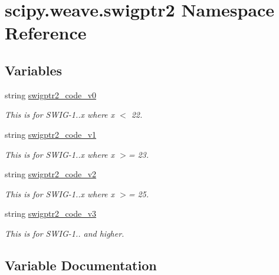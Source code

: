 \hypertarget{namespacescipy_1_1weave_1_1swigptr2}{}\section{scipy.\+weave.\+swigptr2 Namespace Reference}
\label{namespacescipy_1_1weave_1_1swigptr2}
\subsection*{Variables}
\begin{DoxyCompactItemize}
\item 
string \hyperlink{namespacescipy_1_1weave_1_1swigptr2_a585fc46b8f63180b0b9fd2d530d6f3b2}{swigptr2\+\_\+code\+\_\+v0}
\begin{DoxyCompactList}\small\item\em This is for S\+W\+I\+G-\/1..\+x where x $<$ 22. \end{DoxyCompactList}\item 
string \hyperlink{namespacescipy_1_1weave_1_1swigptr2_a8c9c1a3786b0cb399218ee598f5a2cf4}{swigptr2\+\_\+code\+\_\+v1}
\begin{DoxyCompactList}\small\item\em This is for S\+W\+I\+G-\/1..\+x where x $>$= 23. \end{DoxyCompactList}\item 
string \hyperlink{namespacescipy_1_1weave_1_1swigptr2_a2babf5d3e5646c536cc17176f25a9406}{swigptr2\+\_\+code\+\_\+v2}
\begin{DoxyCompactList}\small\item\em This is for S\+W\+I\+G-\/1..\+x where x $>$= 25. \end{DoxyCompactList}\item 
string \hyperlink{namespacescipy_1_1weave_1_1swigptr2_a4fcb47cac914b3c64e18859185d24571}{swigptr2\+\_\+code\+\_\+v3}
\begin{DoxyCompactList}\small\item\em This is for S\+W\+I\+G-\/1.. and higher. \end{DoxyCompactList}\end{DoxyCompactItemize}


\subsection{Variable Documentation}
\hypertarget{namespacescipy_1_1weave_1_1swigptr2_a585fc46b8f63180b0b9fd2d530d6f3b2}{}
